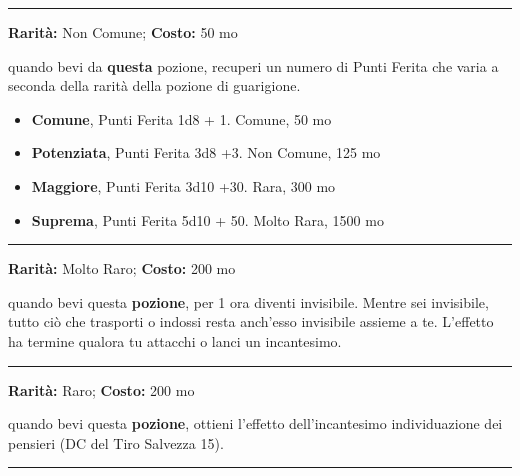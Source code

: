 \begin{multicols}{2}
\smallskip\noindent\rule{\linewidth}{2pt}  \hypertarget{PozionediGuarigione}{}\smallskip{}\noindent\label{PozionediGuarigione}

\textbf{Rarità:} Non Comune; \textbf{Costo:} 50 mo

quando bevi da \textbf{questa} pozione, recuperi un numero di Punti Ferita che varia a seconda della rarità della pozione di guarigione.

\begin{itemize} \setlength\itemsep{0em}
\item \textbf{Comune}, Punti Ferita 1d8 + 1. Comune, 50 mo
\item \textbf{Potenziata}, Punti Ferita 3d8 +3. Non Comune, 125 mo
\item \textbf{Maggiore}, Punti Ferita 3d10 +30. Rara, 300 mo
\item \textbf{Suprema}, Punti Ferita 5d10 + 50. Molto Rara, 1500 mo
\end{itemize}

\smallskip\noindent\rule{\linewidth}{2pt}  \hypertarget{PozionediInvisibilità}{}\smallskip{}\noindent\label{PozionediInvisibilità}

\textbf{Rarità:} Molto Raro; \textbf{Costo:} 200 mo

quando bevi questa \textbf{pozione}, per 1 ora diventi invisibile. Mentre sei invisibile, tutto ciò che trasporti o indossi resta anch'esso invisibile assieme a te. L'effetto ha termine qualora tu attacchi o lanci un incantesimo.

\smallskip\noindent\rule{\linewidth}{2pt}  \hypertarget{PozionediLetturadelPensiero}{}\smallskip{}\noindent\label{PozionediLetturadelPensiero}

\textbf{Rarità:} Raro; \textbf{Costo:} 200 mo

quando bevi questa \textbf{pozione}, ottieni l'effetto dell'incantesimo individuazione dei pensieri (DC del Tiro Salvezza 15).

\smallskip\noindent\rule{\linewidth}{2pt}  \hypertarget{PozionediResistenza}{}\smallskip{}\noindent\label{PozionediResistenza}


\end{multicols}
